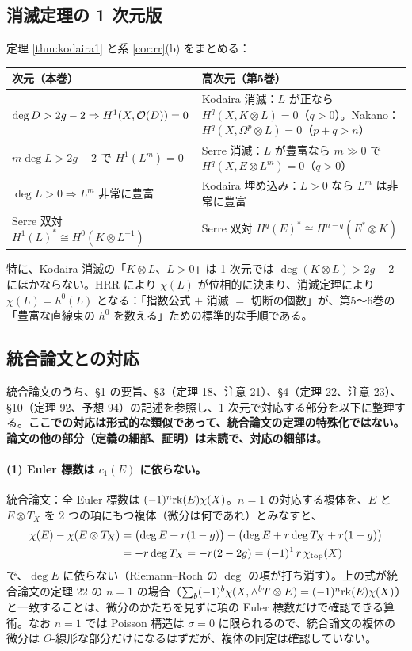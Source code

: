 \subsection{消滅定理の 1 次元版}
定理 \ref{thm:kodaira1} と系 \ref{cor:rr}(b) をまとめる：
\begin{center}
\begin{tabular}{>{\raggedright\arraybackslash}p{}>{\raggedright\arraybackslash}p{}}
\toprule
1 次元（本巻） & 高次元（第5巻）\\
\midrule
$\deg D>2g-2\Rightarrow H^1(X,\mathcal O(D))=0$ & Kodaira 消滅：$L$ が正なら $H^q(X,K\otimes L)=0$（$q>0$）。Nakano：$H^q(X,\Omega^p\otimes L)=0$（$p+q>n$）\\
$m\deg L>2g-2$ で $H^1(L^m)=0$ & Serre 消滅：$L$ が豊富なら $m\gg0$ で $H^q(X,E\otimes L^m)=0$（$q>0$）\\
$\deg L>0\Rightarrow L^m$ 非常に豊富 & Kodaira 埋め込み：$L>0$ なら $L^m$ は非常に豊富\\
Serre 双対 $H^1(L)^*\cong H^0(K\otimes L^{-1})$ & Serre 双対 $H^q(E)^*\cong H^{n-q}(E^*\otimes K)$\\
\bottomrule
\end{tabular}
\end{center}
特に、Kodaira 消滅の「$K\otimes L$、$L>0$」は 1 次元では $\deg(K\otimes L)>2g-2$ にほかならない。HRR により $\chi(L)$ が位相的に決まり、消滅定理により $\chi(L)=h^0(L)$ となる：「指数公式 $+$ 消滅 $=$ 切断の個数」が、第5〜6巻の「豊富な直線束の $h^0$ を数える」ための標準的な手順である。

\subsection{統合論文との対応}\label{sec:unified}
統合論文のうち、§1 の要旨、§3（定理 18、注意 21）、§4（定理 22、注意 23）、§10（定理 92、予想 94）の記述を参照し、1 次元で対応する部分を以下に整理する。\textbf{ここでの対応は形式的な類似であって、統合論文の定理の特殊化ではない。論文の他の部分（定義の細部、証明）は未読で、対応の細部は\tQ}。
\paragraph{(1) Euler 標数は $c_1(E)$ に依らない。}統合論文：全 Euler 標数は $(-1)^n\mathrm{rk}(E)\chi(X)$。$n=1$ の対応する複体を、$E$ と $E\otimes T_X$ を 2 つの項にもつ複体（微分は何であれ）とみなすと、
\begin{align*}
\chi(E)-\chi(E\otimes T_X)&=\bigl(\deg E+r(1-g)\bigr)-\bigl(\deg E+r\deg T_X+r(1-g)\bigr)\\
&=-r\deg T_X=-r(2-2g)=(-1)^1\,r\,\chi_{\rm top}(X)
\end{align*}
で、$\deg E$ に依らない（Riemann--Roch の $\deg$ の項が打ち消す）。上の式が統合論文の定理 22 の $n=1$ の場合（$\sum_b(-1)^b\chi(X,\wedge^bT\otimes E)=(-1)^n\mathrm{rk}(E)\chi(X)$）と一致することは、微分のかたちを見ずに項の Euler 標数だけで確認できる算術。なお $n=1$ では Poisson 構造は $\sigma=0$ に限られるので、統合論文の複体の微分は $O$-線形な部分だけになるはずだが、複体の同定は確認していない。\tQ

